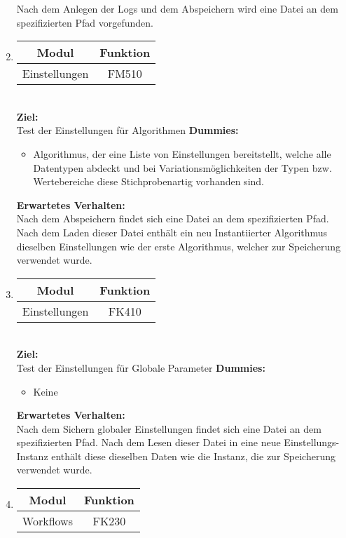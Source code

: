 \begin{enumerate}[align=left, leftmargin=4em, label={\textbf{\textbackslash T2.\arabic*0\textbackslash}} ]
		Nach dem Anlegen der Logs und dem Abspeichern wird eine Datei an dem spezifizierten Pfad vorgefunden.
		\item \begin{tabular}{|c|c|}
			\hline Modul & Funktion \\
			\hline Einstellungen & FM510 \\
			\hline
		\end{tabular}\\
		\subitem \textbf{Ziel:} \\ Test der Einstellungen für Algorithmen
		\subitem \textbf{Dummies:} \begin{itemize}
			\item Algorithmus, der eine Liste von Einstellungen bereitstellt, welche alle Datentypen abdeckt und bei Variationsmöglichkeiten der Typen bzw. Wertebereiche diese Stichprobenartig vorhanden sind.
		\end{itemize}
		\subitem \textbf{Erwartetes Verhalten:}\\
		Nach dem Abspeichern findet sich eine Datei an dem spezifizierten Pfad. Nach dem Laden dieser Datei enthält ein neu Instantiierter Algorithmus dieselben Einstellungen wie der erste Algorithmus, welcher zur Speicherung verwendet wurde.
		\item \begin{tabular}{|c|c|}
			\hline Modul & Funktion \\
			\hline Einstellungen & FK410 \\
			\hline
		\end{tabular}\\
		\subitem \textbf{Ziel:} \\ Test der Einstellungen für Globale Parameter
		\subitem \textbf{Dummies:} \begin{itemize}
			\item Keine
		\end{itemize}
		\subitem \textbf{Erwartetes Verhalten:}\\
		Nach dem Sichern globaler Einstellungen findet sich eine Datei an dem spezifizierten Pfad. Nach dem Lesen dieser Datei in eine neue Einstellungs-Instanz enthält diese dieselben Daten wie die Instanz, die zur Speicherung verwendet wurde.
		\item \begin{tabular}{|c|c|}
			\hline Modul & Funktion \\
			\hline Workflows & FK230 \\
			\hline
		\end{tabular}\\

\end{enumerate}
